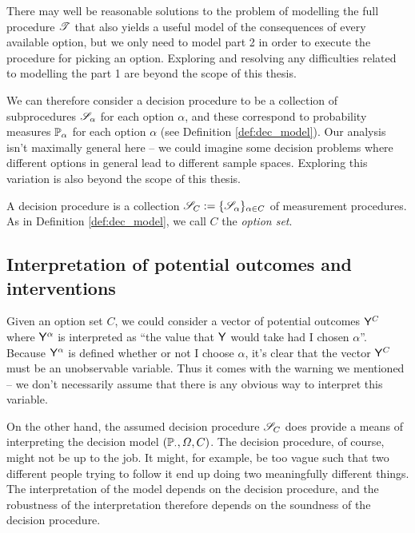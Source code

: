 There may well be reasonable solutions to the problem of modelling the full procedure $\mathscr{T}$ that also yields a useful model of the consequences of every available option, but we only need to model part 2 in order to execute the procedure for picking an option. Exploring and resolving any difficulties related to modelling the part 1 are beyond the scope of this thesis.

We can therefore consider a decision procedure to be a collection of subprocedures $\mathscr{S}_\alpha$ for each option $\alpha$, and these correspond to probability measures $\mathbb{P}_\alpha$ for each option $\alpha$ (see Definition \ref{def:dec_model}). Our analysis isn't maximally general here -- we could imagine some decision problems where different options in general lead to different sample spaces. Exploring this variation is also beyond the scope of this thesis.

\begin{definition}\label{def:dec_proc}
A decision procedure is a collection $\mathscr{S}_C:=\{\mathscr{S}_\alpha\}_{\alpha\in C}$ of measurement procedures. As in Definition \ref{def:dec_model}, we call $C$ the \emph{option set}.
\end{definition}

\subsection{Interpretation of potential outcomes and interventions}

Given an option set $C$, we could consider a vector of potential outcomes $\mathsf{Y}^C$  where $\mathsf{Y}^\alpha$ is interpreted as ``the value that $\mathsf{Y}$ would take had I chosen $\alpha$''. Because $\mathsf{Y}^\alpha$ is defined whether or not I choose $\alpha$, it's clear that the vector $\mathsf{Y}^C$ must be an unobservable variable. Thus it comes with the warning we mentioned -- we don't necessarily assume that there is any obvious way to interpret this variable.

On the other hand, the assumed decision procedure $\mathscr{S}_C$ does provide a means of interpreting the decision model $(\mathbb{P}_\cdot,\Omega,C)$. The decision procedure, of course, might not be up to the job. It might, for example, be too vague such that two different people trying to follow it end up doing two meaningfully different things. The interpretation of the model depends on the decision procedure, and the robustness of the interpretation therefore depends on the soundness of the decision procedure.

